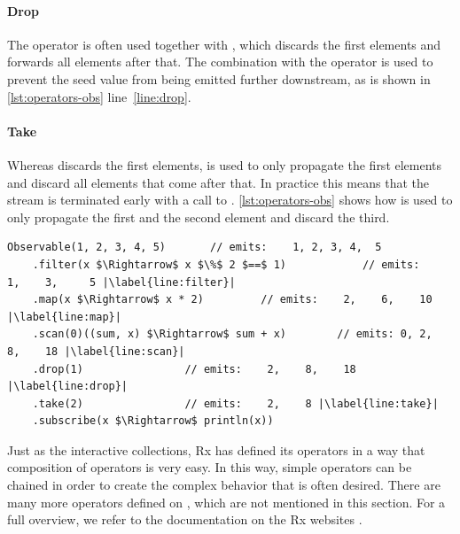 \paragraph{Drop}The  operator is often used together with , which discards the first  elements and forwards all elements after that. The combination with the  operator is used to prevent the seed value from being emitted further downstream, as is shown in \autoref{lst:operators-obs} line~\ref{line:drop}.

\paragraph{Take}Whereas  discards the first  elements,  is used to only propagate the first  elements and discard all elements that come after that. In practice this means that the stream is terminated early with a call to . \autoref{lst:operators-obs} shows how  is used to only propagate the first and the second element and discard the third.

\begin{minipage}{\linewidth}
\begin{lstlisting}[style=ScalaStyle, caption={Operators on \obs}, label={lst:operators-obs}, columns=fixed]
Observable(1, 2, 3, 4, 5)		// emits:    1, 2, 3, 4,  5
    .filter(x $\Rightarrow$ x $\%$ 2 $==$ 1)			// emits:    1,    3,     5 |\label{line:filter}|
    .map(x $\Rightarrow$ x * 2)			// emits:    2,    6,    10 |\label{line:map}|
    .scan(0)((sum, x) $\Rightarrow$ sum + x)		// emits: 0, 2,    8,    18 |\label{line:scan}|
    .drop(1)				// emits:    2,    8,    18 |\label{line:drop}|
    .take(2)				// emits:    2,    8 |\label{line:take}|
    .subscribe(x $\Rightarrow$ println(x))
\end{lstlisting}
\end{minipage}

Just as the interactive collections, Rx has defined its operators in a way that composition of operators is very easy. In this way, simple operators can be chained in order to create the complex behavior that is often desired. There are many more operators defined on \obs, which are not mentioned in this section. For a full overview, we refer to the documentation on the Rx websites \cite{ReactiveX, rx-api, Rx.Net}.

